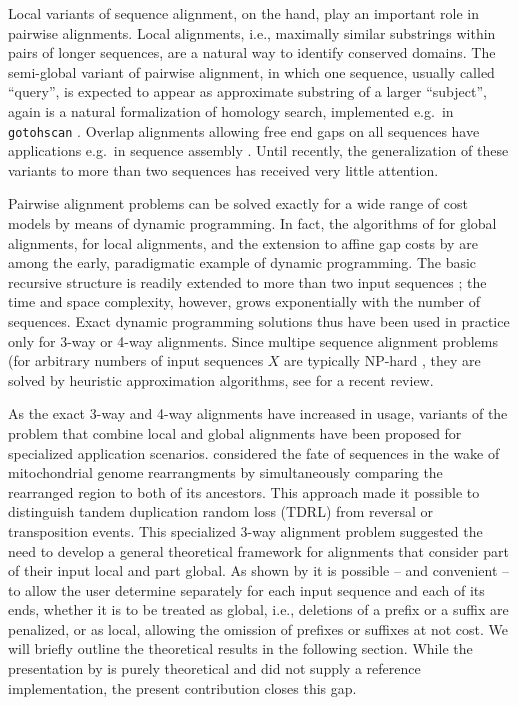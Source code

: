 \documentclass[a4paper,10pt]{article}
\let\cite\citep
\begin{document}
Local variants of sequence alignment, on the hand, play an important role
in pairwise alignments. Local alignments, i.e., maximally similar
substrings within pairs of longer sequences, are a natural way to identify
conserved domains.  The semi-global variant of pairwise alignment, in which
one sequence, usually called ``query'', is expected to appear as
approximate substring of a larger ``subject'', again is a natural
formalization of homology search, implemented e.g.\ in \texttt{gotohscan}
\cite{Hertel:09a}.  Overlap alignments \cite{Jones:04} allowing free end
gaps on all sequences have applications e.g.\ in sequence assembly
\cite{Rausch:09}. Until recently, the generalization of these variants to
more than two sequences has received very little attention.

Pairwise alignment problems can be solved exactly for a wide range of cost
models by means of dynamic programming. In fact, the algorithms of
\citet{Needleman:70} for global alignments, \citet{Smith:81} for local
alignments, and the extension to affine gap costs by \citet{Gotoh:82} are
among the early, paradigmatic example of dynamic programming. The basic
recursive structure is readily extended to more than two input sequences
\cite{Carillo:88,Lipman:89}; the time and space complexity, however, grows
exponentially with the number of sequences. Exact dynamic programming
solutions thus have been used in practice only for 3-way
\cite{Gotoh:86,Dewey:01,Konagurthu:04,Kruspe:07a} or 4-way
\cite{Steiner:11a} alignments. Since multipe sequence alignment problems
(for arbitrary numbers of input sequences $X$ are typically NP-hard
\cite{Kececioglu:93,Wang:94,Bonizzoni:01,Just:01,Manthey:03,Elias:06}, they
are solved by heuristic approximation algorithms, see \citet{Baichoo:17}
for a recent review.

As the exact 3-way and 4-way alignments have increased in usage, variants
of the problem that combine local and global alignments have been proposed
for specialized application scenarios. \citet{AlArab:17a} considered the
fate of sequences in the wake of mitochondrial genome rearrangments by
simultaneously comparing the rearranged region to both of its
ancestors. This approach made it possible to distinguish tandem duplication
random loss (TDRL) from reversal or transposition events. This specialized
3-way alignment problem suggested the need to develop a general theoretical
framework for alignments that consider part of their input local and part
global. As shown by \citet{Retzlaff:18a} it is possible -- and convenient
-- to allow the user determine separately for each input sequence and each
of its ends, whether it is to be treated as global, i.e., deletions of a
prefix or a suffix are penalized, or as local, allowing the omission of
prefixes or suffixes at not cost. We will briefly outline the theoretical
results in the following section. While the presentation by
\citet{Retzlaff:18a} is purely theoretical and did not supply a reference
implementation, the present contribution closes this gap.
\end{document}
